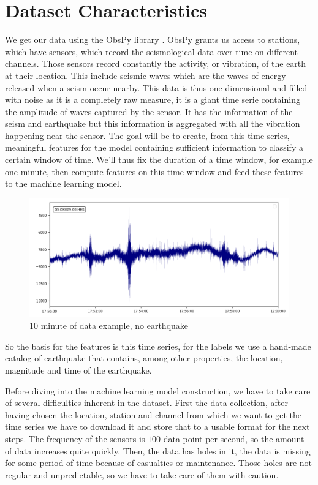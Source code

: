 \documentclass[10pt,conference,compsocconf]{IEEEtran}
\begin{document}
\section{Dataset Characteristics}
We get our data using the ObsPy library \cite{obspy}. ObsPy grants us access to stations, which have sensors, which record the seismological data over time on different channels. Those sensors record  constantly the activity, or vibration, of the earth at their location. This include seismic waves which are the waves of energy released when a seism occur nearby. This data is thus one dimensional and filled with noise as it is a completely raw measure, it is a giant time serie containing the amplitude of waves captured by the sensor. It has the information of the seism and earthquake but this information is aggregated with all the vibration happening near the sensor. The goal will be to create, from this time series, meaningful features for the model containing sufficient information to classify a certain window of time. We'll thus fix the duration of a time window, for example one minute, then compute features on this time window and feed these features to the machine learning model.

\begin{figure}[h]
  \centering
	\includegraphics[width=\columnwidth]{10min-example-2018-06-30T17:50.png}
  \caption{10 minute of data example, no earthquake}
	\label{fig:10min-example}
\end{figure}

So the basis for the features is this time series, for the labels we use a hand-made catalog of earthquake that contains, among other properties, the location, magnitude and time of the earthquake.

Before diving into the machine learning model construction, we have to take care of several difficulties inherent in the dataset.\newline
First the data collection, after having chosen the location, station and channel from which we want to get the time series we have to download it and store that to a usable format for the next steps. The frequency of the sensors is $100$ data point per second, so the amount of data increases quite quickly. Then, the data has holes in it, the data is missing for some period of time because of casualties or maintenance. Those holes are not regular and unpredictable, so we have to take care of them with caution.
\end{document}
